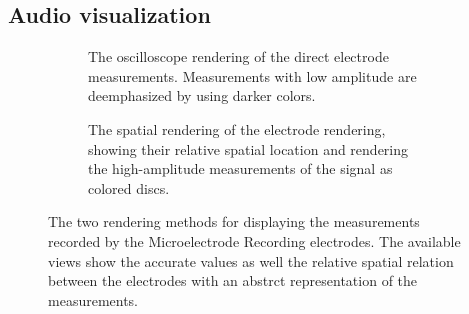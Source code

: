 \subsection{Audio visualization} \label{contributions:dbs:audio}
\begin{figure}
\centering
    \begin{subfigure}[b]{0.49\textwidth}
        \caption{The  oscilloscope rendering of the direct electrode measurements.  Measurements with low amplitude are deemphasized by using darker colors.}
        \label{contributions:dbs:sound:2d}
    \end{subfigure}
    \hfill
    \begin{subfigure}[b]{0.49\textwidth}
        \caption{The spatial  rendering of the electrode rendering, showing their relative spatial location and rendering the high-amplitude measurements of the signal as colored discs.}
        \label{contributions:dbs:sound:3d}
    \end{subfigure}
    \caption{The two rendering methods for displaying the measurements recorded by the Microelectrode Recording electrodes.  The available views show the accurate values as well the relative spatial relation between the electrodes with an abstrct representation of the measurements.}
    \label{contributions:dbs:sound}
\end{figure}

